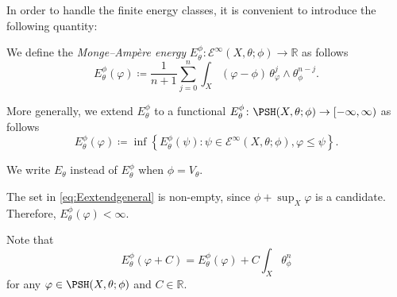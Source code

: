 In order to handle the finite energy classes, it is convenient to introduce the following quantity:
\begin{definition}\label{def:MAenergy}
    We define the \emph{Monge--Amp\`ere energy} $E^{\phi}_{\theta}\colon \mathcal{E}^{\infty}(X,\theta;\phi)\rightarrow \mathbb{R}$ as follows
    \begin{equation}\label{eq:Edefbdd}
        E^{\phi}_{\theta}(\varphi)\coloneqq \frac{1}{n+1}\sum_{j=0}^n \int_X (\varphi-\phi)\, \theta_{\varphi}^j\wedge \theta_{\phi}^{n-j}.
    \end{equation}


    More generally, we extend $E_{\theta}^{\phi}$ to a functional $E^{\phi}_{\theta}\colon \PSH(X,\theta;\phi)\rightarrow [-\infty,\infty)$ as follows
    \begin{equation}\label{eq:Eextendgeneral}
        E^{\phi}_{\theta}(\varphi)\coloneqq \inf\left\{E^{\phi}_{\theta}(\psi):\psi\in \mathcal{E}^{\infty}(X,\theta;\phi),\varphi\leq \psi\right\}.
    \end{equation}

     We write $E_{\theta}$ instead of $E_{\theta}^{\phi}$ when $\phi=V_{\theta}$.
\end{definition}
The set in \eqref{eq:Eextendgeneral} is non-empty, since $\phi+\sup_X \varphi$ is a candidate. Therefore, $E^{\phi}_{\theta}(\varphi)<\infty$.


Note that
\begin{equation}\label{eq:Ephiaddcst}
E^{\phi}_{\theta}(\varphi+C)=E^{\phi}_{\theta}(\varphi)+C\int_X \theta_{\phi}^n
\end{equation}
for any $\varphi\in \PSH(X,\theta;\phi)$ and $C\in \mathbb{R}$.



